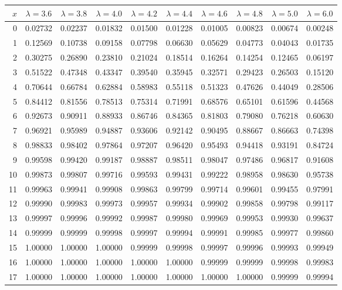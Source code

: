 \myskip
\begin{tabular}{r|*{9}{c}}
$x$ &  $\lambda=3.6$  &  $\lambda=3.8$  &  $\lambda=4.0$  &  $\lambda=4.2$  &  $\lambda=4.4$  
    &  $\lambda=4.6$  &  $\lambda=4.8$  &  $\lambda=5.0$  &  $\lambda=6.0$                    \\\hline
  0 & 0.02732 & 0.02237 & 0.01832 & 0.01500 & 0.01228 & 0.01005 & 0.00823 & 0.00674 & 0.00248 \\
  1 & 0.12569 & 0.10738 & 0.09158 & 0.07798 & 0.06630 & 0.05629 & 0.04773 & 0.04043 & 0.01735 \\
  2 & 0.30275 & 0.26890 & 0.23810 & 0.21024 & 0.18514 & 0.16264 & 0.14254 & 0.12465 & 0.06197 \\
  3 & 0.51522 & 0.47348 & 0.43347 & 0.39540 & 0.35945 & 0.32571 & 0.29423 & 0.26503 & 0.15120 \\
  4 & 0.70644 & 0.66784 & 0.62884 & 0.58983 & 0.55118 & 0.51323 & 0.47626 & 0.44049 & 0.28506 \\
  5 & 0.84412 & 0.81556 & 0.78513 & 0.75314 & 0.71991 & 0.68576 & 0.65101 & 0.61596 & 0.44568 \\
  6 & 0.92673 & 0.90911 & 0.88933 & 0.86746 & 0.84365 & 0.81803 & 0.79080 & 0.76218 & 0.60630 \\
  7 & 0.96921 & 0.95989 & 0.94887 & 0.93606 & 0.92142 & 0.90495 & 0.88667 & 0.86663 & 0.74398 \\
  8 & 0.98833 & 0.98402 & 0.97864 & 0.97207 & 0.96420 & 0.95493 & 0.94418 & 0.93191 & 0.84724 \\
  9 & 0.99598 & 0.99420 & 0.99187 & 0.98887 & 0.98511 & 0.98047 & 0.97486 & 0.96817 & 0.91608 \\
 10 & 0.99873 & 0.99807 & 0.99716 & 0.99593 & 0.99431 & 0.99222 & 0.98958 & 0.98630 & 0.95738 \\
 11 & 0.99963 & 0.99941 & 0.99908 & 0.99863 & 0.99799 & 0.99714 & 0.99601 & 0.99455 & 0.97991 \\
 12 & 0.99990 & 0.99983 & 0.99973 & 0.99957 & 0.99934 & 0.99902 & 0.99858 & 0.99798 & 0.99117 \\
 13 & 0.99997 & 0.99996 & 0.99992 & 0.99987 & 0.99980 & 0.99969 & 0.99953 & 0.99930 & 0.99637 \\
 14 & 0.99999 & 0.99999 & 0.99998 & 0.99997 & 0.99994 & 0.99991 & 0.99985 & 0.99977 & 0.99860 \\
 15 & 1.00000 & 1.00000 & 1.00000 & 0.99999 & 0.99998 & 0.99997 & 0.99996 & 0.99993 & 0.99949 \\
 16 & 1.00000 & 1.00000 & 1.00000 & 1.00000 & 1.00000 & 0.99999 & 0.99999 & 0.99998 & 0.99983 \\
 17 & 1.00000 & 1.00000 & 1.00000 & 1.00000 & 1.00000 & 1.00000 & 1.00000 & 0.99999 & 0.99994 \\
\end{tabular}

